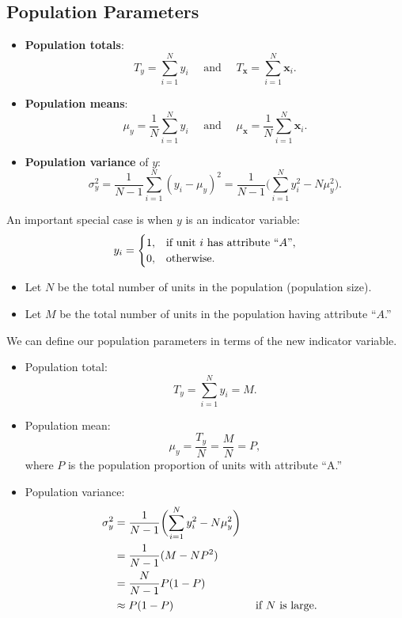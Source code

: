 \documentclass[oneside]{book}\usepackage[]{graphicx}\usepackage[svgnames]{xcolor}
\providecommand{\Vector}[1]{\bm{#1}}%
\begin{document}
\subsection*{Population Parameters}
\begin{Regular}{}
      \begin{itemize}
            \item \textbf{Population totals}:
                  \[ T_y=\sum_{i=1}^{N}y_i\quad\text{ and }\quad T_{\Vector{x}}=\sum_{i=1}^{N}\Vector{x}_i. \]
            \item \textbf{Population means}:
                  \[ \mu_y=\frac{1}{N}\sum_{i=1}^{N}y_i\quad\text{ and }\quad \mu_{\Vector{x}}=\frac{1}{N}\sum_{i=1}^{N}\Vector{x}_i. \]
            \item \textbf{Population variance} of $ y $:
                  \[ \sigma_y^2=\frac{1}{N-1}\sum_{i=1}^{N}(y_i-\mu_y)^2
                        =\frac{1}{N-1}\biggl(\sum_{i=1}^{N}y_i^2-N\mu_y^2\biggr). \]
      \end{itemize}
\end{Regular}
\begin{Regular}{}
      An important special case is when $y$ is an indicator variable:
      \[ y_i=\begin{cases}
                  1, & \text{if unit $ i $ has attribute ``$A$''}, \\
                  0, & \text{otherwise}.
            \end{cases} \]
      \begin{itemize}
            \item Let $ N $ be the total number of units in the population (population size).
            \item Let $ M $ be the total number of units in the population having attribute ``$A$.''
      \end{itemize}
      \tcblower{}
      We can define our population parameters in terms of the new indicator variable.
      \begin{itemize}
            \item Population total:
                  \[ T_y=\sum_{i=1}^{N}y_i=M. \]
            \item Population mean:
                  \[ \mu_y=\frac{T_y}{N}=\frac{M}{N}=P, \]
                  where $ P $ is the population proportion of units with attribute ``A.''
            \item Population variance:
                  \begin{align*}
                        \sigma_y^2
                         & =\frac{1}{N-1}\biggl(\sum_{i=1}^{N}y_i^2-N\mu_y^2\biggr)                                 \\
                         & =\frac{1}{N-1}(M-NP^2)                                                                   \\
                         & =\frac{N}{N-1}P(1-P)                                                                     \\
                         & \approx P(1-P)                                           &  & \text{ if $ N $ is large}.
                  \end{align*}
      \end{itemize}
\end{Regular}
\end{document}
